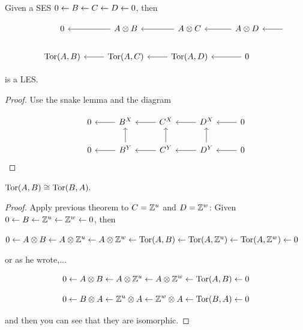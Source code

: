 \documentclass[11pt,leqno,oneside]{amsart}
\numberwithin{thm}{section}
\begin{document}
\begin{thm}
  Given a SES $0 \leftarrow B \leftarrow C \leftarrow D \leftarrow 0$, then

  $$\begin{tikzcd}
    & 0 & A \tprod B \arrow[l, ""] & A \tprod C \arrow[l, ""] & A \tprod D \arrow[l, ""] &\, \arrow[l, ""] \\
    & \Tor(A, B) & \Tor(A, C) \arrow[l, ""] & \Tor(A, D) \arrow[l, ""] & 0 \arrow[l, ""]
  \end{tikzcd}$$

  is a LES.
\end{thm}
\begin{proof}
  Use the snake lemma and the diagram

  $$\begin{tikzcd}
    & 0 & B^X \arrow[l, ""] & C^X \arrow[l, ""] & D^X \arrow[l, ""] & 0 \arrow[l, ""] \\
    & 0 & B^Y \arrow[l, ""] \arrow[u, ""] & C^Y \arrow[l, ""] \arrow[u, ""] & D^Y \arrow[l, ""] \arrow[u, ""] & 0 \arrow[l, ""]
  \end{tikzcd}$$
\end{proof}
\begin{thm}
  $\operatorname{Tor}(A, B) \mathrel{\cong} \operatorname{Tor}(B, A).$
\end{thm}
\begin{proof}
  Apply previous theorem to $C = {\mathbb Z}^u$ and $D = {\mathbb Z}^w$:  Given $0 \leftarrow B \leftarrow {\mathbb Z}^u \leftarrow {\mathbb Z}^w \leftarrow 0$, then

  $0 \leftarrow A \otimes B \leftarrow A \otimes {\mathbb Z}^u \leftarrow A \otimes {\mathbb Z}^w \leftarrow \operatorname{Tor}(A, B) \leftarrow \operatorname{Tor}(A, {\mathbb Z}^u) \leftarrow \operatorname{Tor}(A, {\mathbb Z}^w) \leftarrow 0$

  or as he wrote,...

  $$0 \leftarrow A \otimes B \leftarrow A \otimes {\mathbb Z}^u \leftarrow A \otimes {\mathbb Z}^w \leftarrow \operatorname{Tor}(A, B) \leftarrow 0$$

  $$0 \leftarrow B \otimes A \leftarrow {\mathbb Z}^u \otimes A \leftarrow {\mathbb Z}^w \otimes A \leftarrow \operatorname{Tor}(B, A) \leftarrow 0$$

  and then you can see that they are isomorphic.
\end{proof}
\end{document}
